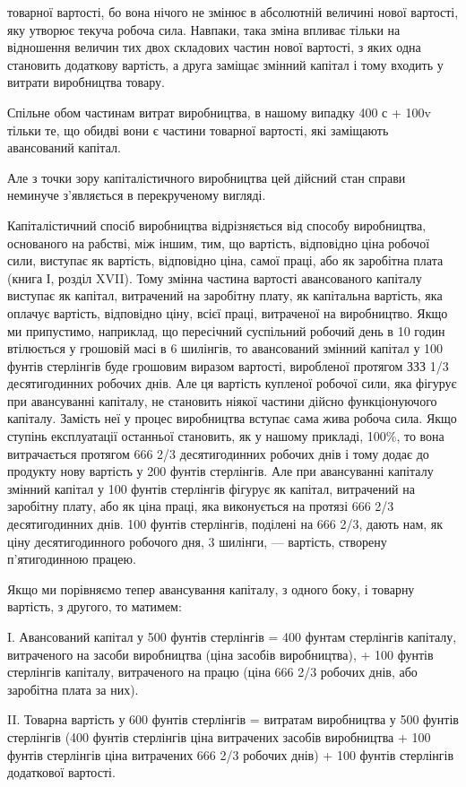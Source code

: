 \parcont{}  %
товарної вартості, бо вона нічого не змінює в абсолютній величині
нової вартості, яку утворює текуча робоча сила. Навпаки,
така зміна впливає тільки на відношення величин тих двох складових
частин нової вартості, з яких одна становить додаткову
вартість, а друга заміщає змінний капітал і тому входить у витрати
виробництва товару.

Спільне обом частинам витрат виробництва, в нашому випадку
400 с + 100v тільки те, що обидві вони є частини товарної
вартості, які заміщають авансований капітал.

Але з точки зору капіталістичного виробництва цей дійсний
стан справи неминуче з’являється в перекрученому вигляді.

Капіталістичний спосіб виробництва відрізняється від способу
виробництва, основаного на рабстві, між іншим, тим, що
вартість, відповідно ціна робочої сили, виступає як вартість,
відповідно ціна, самої праці, або як заробітна плата (книга І,
розділ XVII). Тому змінна частина вартості авансованого капіталу
виступає як капітал, витрачений на заробітну плату,
як капітальна вартість, яка оплачує вартість, відповідно ціну,
всієї праці, витраченої на виробництво. Якщо ми припустимо,
наприклад, що пересічний суспільний робочий день в 10 годин
втілюється у грошовій масі в 6 шилінгів, то авансований
змінний капітал у 100 фунтів стерлінгів буде грошовим
виразом вартості, виробленої протягом ЗЗЗ 1/3 десятигодинних
робочих днів. Але ця вартість купленої робочої сили, яка фігурує
при авансуванні капіталу, не становить ніякої частини
дійсно функціонуючого капіталу. Замість неї у процес виробництва
вступає сама жива робоча сила. Якщо ступінь експлуатації
останньої становить, як у нашому прикладі, 100\%, то вона
витрачається протягом 666 2/3 десятигодинних робочих днів і тому
додає до продукту нову вартість у 200 фунтів стерлінгів. Але
при авансуванні капіталу змінний капітал у 100 фунтів стерлінгів
фігурує як капітал, витрачений на заробітну плату, або як
ціна праці, яка виконується на протязі 666 2/3 десятигодинних
днів. 100 фунтів стерлінгів, поділені на 666 2/3, дають нам, як
ціну десятигодинного робочого дня, 3 шилінги, — вартість, створену
п’ятигодинною працею.

Якщо ми порівняємо тепер авансування капіталу, з одного
боку, і товарну вартість, з другого, то матимем:

I. Авансований капітал у 500 фунтів стерлінгів = 400 фунтам
стерлінгів капіталу, витраченого на засоби виробництва
(ціна засобів виробництва), + 100 фунтів стерлінгів капіталу,
витраченого на працю (ціна 666 2/3 робочих днів, або заробітна
плата за них).

II. Товарна вартість у 600 фунтів стерлінгів = витратам виробництва
у 500 фунтів стерлінгів (400 фунтів стерлінгів
ціна витрачених засобів виробництва + 100 фунтів стерлінгів
ціна витрачених 666 2/3 робочих днів) + 100 фунтів
стерлінгів додаткової вартості.
